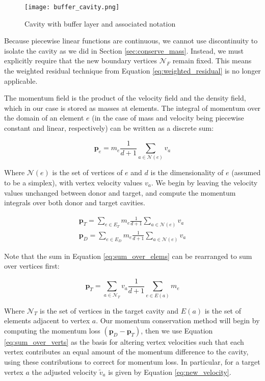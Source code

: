 \begin{figure}
\begin{center}
\texttt{[image: buffer\_cavity.png]}
\caption{Cavity with buffer layer and associated notation}
\label{fig:buffer_cavity}
\end{center}
\end{figure}

Because piecewise linear functions are continuous, we cannot
use discontinuity to isolate the cavity as we did in Section
\ref{sec:conserve_mass}.
Instead, we must explicitly require that the new boundary vertices
$\mathcal{N}_F$ remain fixed.
This means the weighted residual technique from Equation
\ref{eq:weighted_residual} is no longer applicable.

The momentum field is the product of the velocity field
and the density field, which in our case is stored as masses
at elements.
The integral of momentum over the domain of an element $e$
(in the case of mass and velocity being piecewise constant
and linear, respectively)
can be written as a discrete sum:

\begin{equation} \label{eq:element_momentum}
\mathbf{p}_{e} = m_e \frac1{d+1}\sum_{a \in \mathcal{N}(e)} v_a
\end{equation}

Where $\mathcal{N}(e)$ is the set of vertices of $e$ and
$d$ is the dimensionality of $e$ (assumed to be a simplex),
with vertex velocity values $v_a$.
We begin by leaving the velocity values unchanged between
donor and target, and compute the momentum integrals
over both donor and target cavities.

\begin{gather} \label{eq:sum_over_elems}
\mathbf{p}_T = \sum_{e \in E_T} m_e \frac1{d+1}\sum_{a \in \mathcal{N}(e)} v_a \\
\mathbf{p}_D = \sum_{e \in E_D} m_e \frac1{d+1}\sum_{a \in \mathcal{N}(e)} v_a
\end{gather}

Note that the sum in Equation \ref{eq:sum_over_elems} can be rearranged
to sum over vertices first:

\begin{equation} \label{eq:sum_over_verts}
\mathbf{p}_T = \sum_{a \in \mathcal{N}_T} v_a \frac1{d+1} \sum_{e \in E(a)} m_e
\end{equation}

Where $\mathcal{N}_T$ is the set of vertices in the target cavity and
$E(a)$ is the set of elements adjacent to vertex $a$.
Our momentum conservation method will begin by computing the
momentum loss $(\mathbf{p}_D - \mathbf{p}_T)$, then
we use Equation \ref{eq:sum_over_verts} as the basis for
altering vertex velocities such that each vertex contributes
an equal amount of the momentum difference to the cavity,
using these contributions to correct for momentum loss.
In particular, for a target vertex $a$ the adjusted velocity
$\tilde{v}_a$ is given by Equation \ref{eq:new_velocity}.

